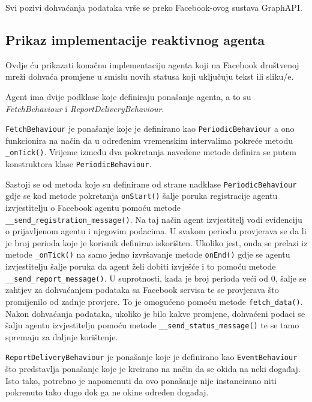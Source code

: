 \documentclass[a4paper,12pt]{foi}
\begin{document}
Svi pozivi dohvaćanja podataka vrše se preko Facebook-ovog sustava GraphAPI.

\subsection{Prikaz implementacije reaktivnog agenta}

Ovdje ću prikazati konačnu implementaciju agenta koji na Facebook društvenoj mreži dohvaća promjene u smislu novih statusa koji uključuju tekst ili sliku/e.

\lstset{commentstyle=\textit,language=python}


Agent ima dvije podklase koje definiraju ponašanje agenta, a to su \textit{FetchBehaviour} i \textit{ReportDeliveryBehaviour}.

\texttt{FetchBehaviour} je ponašanje koje je definirano kao \texttt{PeriodicBehaviour} a ono funkcionira na način da u određenim vremenskim intervalima pokreće metodu \texttt{\_onTick()}. Vrijeme između dva pokretanja navedene metode definira se putem konstruktora klase \texttt{PeriodicBehaviour}. 

Sastoji se od metoda koje su definirane od strane nadklase \texttt{PeriodicBehaviour} gdje se kod metode pokretanja \texttt{onStart()} šalje poruka registracije agentu izvjestitelju o Facebook agentu pomoću metode \texttt{\_\_send\_registration\_message()}. Na taj način agent izvjestitelj vodi evidenciju o prijavljenom agentu i njegovim podacima. U svakom periodu provjerava se da li je broj perioda koje je korisnik definirao iskorišten. Ukoliko jest, onda se prelazi iz metode \texttt{\_onTick()} na samo jedno izvršavanje metode \texttt{onEnd()} gdje se agentu izvjestitelju šalje poruka da agent želi dobiti izvješće i to pomoću metode \texttt{\_\_send\_report\_message()}. U suprotnosti, kada je broj perioda veći od 0, šalje se zahtjev za dohvaćanjem podataka sa Facebook servisa te se provjerava što promijenilo od zadnje provjere. To je omogućeno pomoću metode \texttt{fetch\_data()}. Nakon dohvaćanja podataka, ukoliko je bilo kakve promjene, dohvaćeni podaci se šalju agentu izvjestitelju pomoću metode \texttt{\_\_send\_status\_message()} te se tamo spremaju za daljnje korištenje.

\texttt{ReportDeliveryBehaviour} je ponašanje koje je definirano kao \texttt{EventBehaviour} što predstavlja ponašanje koje je kreirano na način da se okida na neki događaj. Isto tako, potrebno je napomenuti da ovo ponašanje nije instancirano niti pokrenuto tako dugo dok ga ne okine određen događaj.
\end{document}
